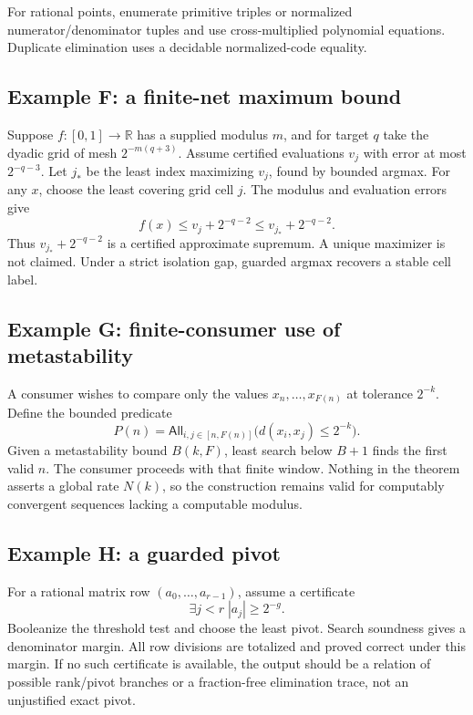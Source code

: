 For rational points, enumerate primitive triples or normalized numerator/denominator tuples and use cross-multiplied polynomial equations.  Duplicate elimination uses a decidable normalized-code equality.

\subsection{Example F: a finite-net maximum bound}

Suppose \(f:[0,1]\to\mathbb R\) has a supplied modulus \(m\), and for target \(q\) take the dyadic grid of mesh \(2^{-m(q+3)}\).  Assume certified evaluations \(v_j\) with error at most \(2^{-q-3}\).  Let \(j_*\) be the least index maximizing \(v_j\), found by bounded argmax.  For any \(x\), choose the least covering grid cell \(j\).  The modulus and evaluation errors give
\[
 f(x)\le v_j+2^{-q-2}\le v_{j_*}+2^{-q-2}.
\]
Thus \(v_{j_*}+2^{-q-2}\) is a certified approximate supremum.  A unique maximizer is not claimed.  Under a strict isolation gap, guarded argmax recovers a stable cell label.

\subsection{Example G: finite-consumer use of metastability}

A consumer wishes to compare only the values \(x_n,\ldots,x_{F(n)}\) at tolerance \(2^{-k}\).  Define the bounded predicate
\[
 P(n)=\mathsf{All}_{i,j\in[n,F(n)]}\bigl(d(x_i,x_j)\le2^{-k}\bigr).
\]
Given a metastability bound \(B(k,F)\), least search below \(B+1\) finds the first valid \(n\).  The consumer proceeds with that finite window.  Nothing in the theorem asserts a global rate \(N(k)\), so the construction remains valid for computably convergent sequences lacking a computable modulus.

\subsection{Example H: a guarded pivot}

For a rational matrix row \((a_0,\ldots,a_{r-1})\), assume a certificate
\[
 \exists j<r\;|a_j|\ge2^{-g}.
\]
Booleanize the threshold test and choose the least pivot.  Search soundness gives a denominator margin.  All row divisions are totalized and proved correct under this margin.  If no such certificate is available, the output should be a relation of possible rank/pivot branches or a fraction-free elimination trace, not an unjustified exact pivot.
